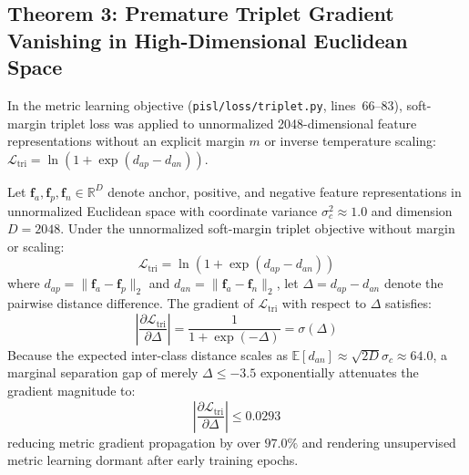 \subsection{Theorem 3: Premature Triplet Gradient Vanishing in High-Dimensional Euclidean Space}
\label{subsec:thm3}

In the metric learning objective (\texttt{pisl/loss/triplet.py}, lines~66--83), soft-margin triplet loss was applied to unnormalized 2048-dimensional feature representations without an explicit margin $m$ or inverse temperature scaling: $\mathcal{L}_{\text{tri}} = \ln(1 + \exp(d_{ap} - d_{an}))$.

\begin{theorem}
\label{thm:triplet_saturation}
\label{thm:hyperspherical_saturation}
\label{thm:triplet_gradient_vanishing}
Let $\mathbf{f}_a, \mathbf{f}_p, \mathbf{f}_n \in \mathbb{R}^D$ denote anchor, positive, and negative feature representations in unnormalized Euclidean space with coordinate variance $\sigma_c^2 \approx 1.0$ and dimension $D = 2048$. Under the unnormalized soft-margin triplet objective without margin or scaling:
\begin{equation}
    \mathcal{L}_{\text{tri}} = \ln\left(1 + \exp\left(d_{ap} - d_{an}\right)\right)
\end{equation}
where $d_{ap} = \|\mathbf{f}_a - \mathbf{f}_p\|_2$ and $d_{an} = \|\mathbf{f}_a - \mathbf{f}_n\|_2$, let $\Delta = d_{ap} - d_{an}$ denote the pairwise distance difference.
The gradient of $\mathcal{L}_{\text{tri}}$ with respect to $\Delta$ satisfies:
\begin{equation}
    \left| \frac{\partial \mathcal{L}_{\text{tri}}}{\partial \Delta} \right| = \frac{1}{1 + \exp(-\Delta)} = \sigma(\Delta)
\end{equation}
Because the expected inter-class distance scales as $\mathbb{E}[d_{an}] \approx \sqrt{2D}\sigma_c \approx 64.0$, a marginal separation gap of merely $\Delta \le -3.5$ exponentially attenuates the gradient magnitude to:
\begin{equation}
    \left| \frac{\partial \mathcal{L}_{\text{tri}}}{\partial \Delta} \right| \le 0.0293
\end{equation}
reducing metric gradient propagation by over $97.0\%$ and rendering unsupervised metric learning dormant after early training epochs.
\end{theorem}

